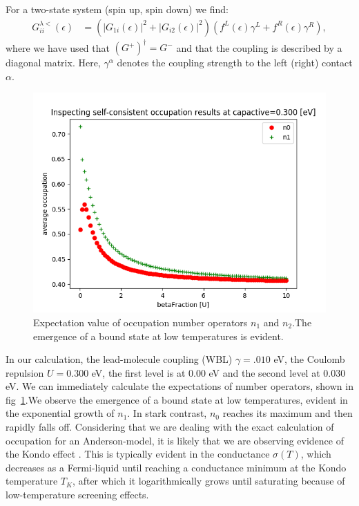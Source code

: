 \documentclass{article}
\begin{document}
\begin{multicols}{2}
        For a two-state system (spin up, spin down) we find:
        \begin{align*}
            G^{\lambda<}_{ii}(\epsilon) &= \left(\left|G_{1i}(\epsilon)\right|^2 + \left|G_{i2}(\epsilon)\right|^2 \right)\left(f^L (\epsilon) \gamma^L+f^R (\epsilon) \gamma^R\right),
        \end{align*}
        where we have used that $(G^+)^\dagger=G^-$ and that the coupling is described by a diagonal matrix. Here, $\gamma^\alpha$ denotes the coupling strength to the left (right) contact $\alpha$.
        
        \begin{figure}[b]
            \centering
            \includegraphics[width=\textwidth]{zeroBiasOccupation}
            \caption{\label{fig:numberoperators}Expectation value of occupation number operators $n_1$ and $n_2$.The emergence of a bound state at low temperatures is evident.}
        \end{figure}
         
        
        In our calculation, the lead-molecule coupling (WBL) $\gamma=.010$ eV, the Coulomb repulsion $U=0.300$ eV, the first level is at $0.00$ eV and the second level at $0.030$ eV. We can immediately calculate the expectations of number operators, shown in fig~\ref{fig:numberoperators}.We observe the emergence of a bound state at low temperatures, evident in the exponential growth of $n_1$. In stark contrast, $n_0$ reaches its maximum and then rapidly falls off. Considering that we are dealing with the exact calculation of occupation for an Anderson-model, it is likely that we are observing evidence of the Kondo effect \cite{josherrereview}. This is typically evident in the conductance $\sigma(T)$, which decreases as a Fermi-liquid
        until reaching a conductance minimum at the Kondo temperature $T_K$, after which it logarithmically grows until saturating because of low-temperature screening effects.
        

\end{multicols}
\end{document}
